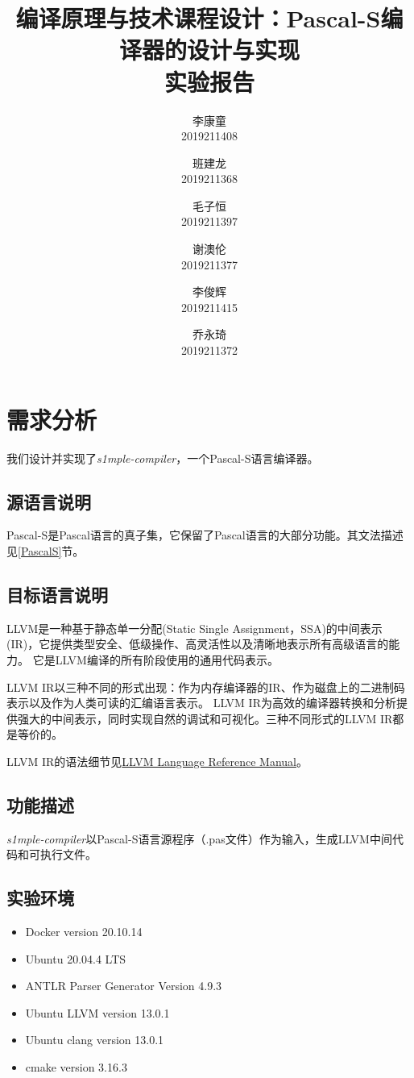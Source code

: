 \documentclass[lang=cn,11pt,a4paper,cite=authornum]{paper}
\title{编译原理与技术课程设计：Pascal-S编译器的设计与实现\\ 实验报告}
\author{李康童 \\ 2019211408 \and 班建龙 \\ 2019211368 \and 毛子恒 \\ 2019211397 \and 谢澳伦 \\ 2019211377 \and 李俊辉 \\ 2019211415 \and 乔永琦 \\ 2019211372}
\institute{北京邮电大学\ 计算机学院（国家示范性软件学院）}
\date{\zhtoday}
\begin{document}
\maketitle

\tableofcontents

\newpage

\section{需求分析}

我们设计并实现了\emph{s1mple-compiler}，一个Pascal-S语言编译器。

\subsection{源语言说明}

Pascal-S是Pascal语言的真子集，它保留了Pascal语言的大部分功能。其文法描述见\ref{PascalS}节。

\subsection{目标语言说明}

LLVM是一种基于静态单一分配(Static Single Assignment，SSA)的中间表示(IR)，它提供类型安全、低级操作、高灵活性以及清晰地表示所有高级语言的能力。 它是LLVM编译的所有阶段使用的通用代码表示。

LLVM IR以三种不同的形式出现：作为内存编译器的IR、作为磁盘上的二进制码表示以及作为人类可读的汇编语言表示。
LLVM IR为高效的编译器转换和分析提供强大的中间表示，同时实现自然的调试和可视化。三种不同形式的LLVM IR都是等价的。

LLVM IR的语法细节见\href{https://llvm.org/docs/LangRef.html}{LLVM Language Reference Manual}。

\subsection{功能描述}

\emph{s1mple-compiler}以Pascal-S语言源程序（.pas文件）作为输入，生成LLVM中间代码和可执行文件。

\subsection{实验环境}

\begin{itemize}
    \item Docker version 20.10.14
    \item Ubuntu 20.04.4 LTS
    \item ANTLR Parser Generator Version 4.9.3
    \item Ubuntu LLVM version 13.0.1
    \item Ubuntu clang version 13.0.1
    \item cmake version 3.16.3
\end{itemize}
\end{document}
